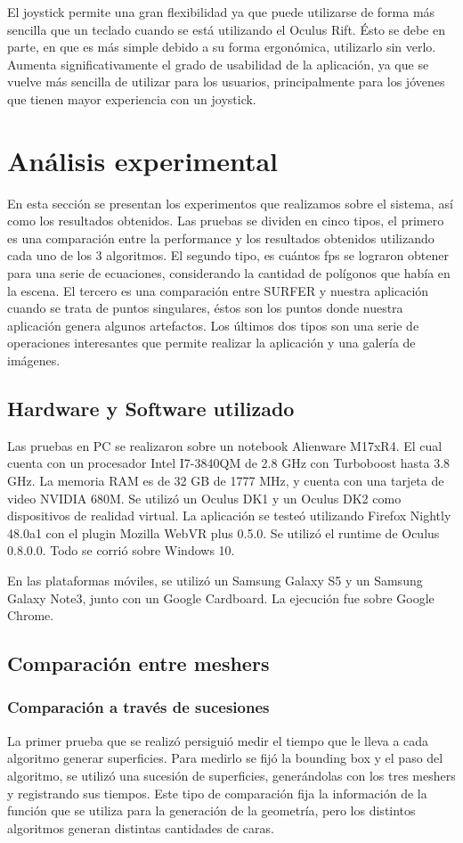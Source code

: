 \documentclass[12pt]{article}
\begin{document}
El joystick permite una gran flexibilidad ya que puede utilizarse de forma más sencilla que un teclado cuando se está utilizando el Oculus Rift. Ésto se debe en parte, en que es más simple debido a su forma ergonómica, utilizarlo sin verlo. Aumenta significativamente el grado de usabilidad de la aplicación, ya que se vuelve más sencilla de utilizar para los usuarios, principalmente para los jóvenes que tienen mayor experiencia con un joystick.
\clearpage
\section{Análisis experimental}
En esta sección se presentan los experimentos que realizamos sobre el sistema, así como los resultados obtenidos. Las pruebas se dividen en cinco tipos, el primero es una comparación entre la performance y los resultados obtenidos utilizando cada uno de los 3 algoritmos. El segundo tipo, es cuántos fps se lograron obtener para una serie de ecuaciones, considerando la cantidad de polígonos que había en la escena. El tercero es una comparación entre SURFER y nuestra aplicación cuando se trata de puntos singulares, éstos son los puntos donde nuestra aplicación genera algunos artefactos. Los últimos dos tipos son una serie de operaciones interesantes que permite realizar la aplicación y una galería de imágenes.
\subsection{Hardware y Software utilizado}
Las pruebas en PC se realizaron sobre un notebook Alienware M17xR4. El cual cuenta con un procesador Intel I7-3840QM de 2.8 GHz con Turboboost hasta 3.8 GHz. La memoria RAM es de 32 GB de 1777 MHz, y cuenta con una tarjeta de video NVIDIA 680M. Se utilizó un Oculus DK1 y un Oculus DK2 como dispositivos de realidad virtual. La aplicación se testeó utilizando Firefox Nightly 48.0a1 con el plugin Mozilla WebVR plus 0.5.0. Se utilizó el runtime de Oculus 0.8.0.0. Todo se corrió sobre Windows 10.

En las plataformas móviles, se utilizó un Samsung  Galaxy S5 y un Samsung  Galaxy Note3, junto con un Google Cardboard. La ejecución fue sobre Google Chrome.

\subsection{Comparación entre meshers}
\subsubsection{Comparación a través de sucesiones}
La primer prueba que se realizó persiguió medir el tiempo que le lleva a cada algoritmo generar superficies. Para medirlo se fijó la bounding box y el paso del algoritmo, se utilizó una sucesión de superficies, generándolas con los tres meshers y registrando sus tiempos. Este tipo de comparación fija la información de la función que se utiliza para la generación de la geometría, pero los distintos algoritmos generan distintas cantidades de caras.
\end{document}
